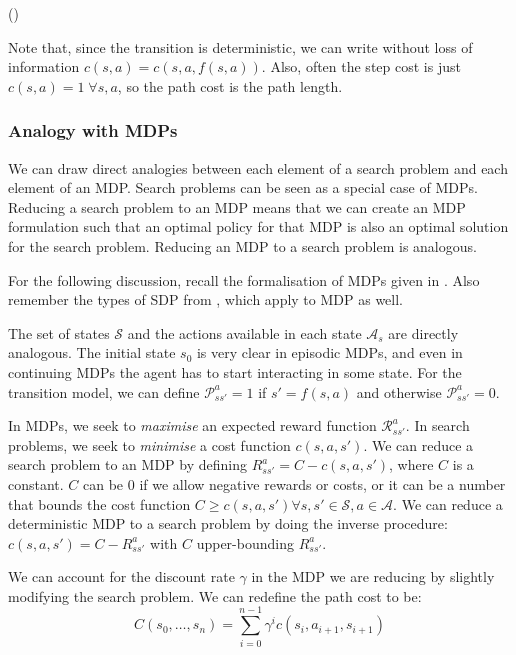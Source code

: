 (\cite[Section~3.1]{russell2009aima})

Note that, since the transition is deterministic, we can write without loss of
information $c(s, a) = c(s, a, f(s, a))$. Also, often the step cost is just
$c(s,a)=1 \; \forall s, a$, so the path cost is the path length. 

\subsubsection{Analogy with \acp{MDP}}
We can draw direct analogies between each element of a search problem and each
element of an \ac{MDP}. Search problems can be seen as a special case of
\acp{MDP}. Reducing a search problem to an \ac{MDP} means that we can create an
\ac{MDP} formulation such that an optimal policy for that \ac{MDP} is also an
optimal solution for the search problem. Reducing an \ac{MDP} to a search
problem is analogous.

For the following discussion, recall the formalisation of \acp{MDP} given in
. Also remember the types of \ac{SDP} from
, which apply to \ac{MDP} as well.

The set of states $\mathcal{S}$ and the actions available in each state
$\mathcal{A}_s$ are directly analogous. The initial state $s_0$ is very clear in
episodic \acp{MDP}, and even in continuing \acp{MDP} the agent has to start
interacting in some state. For the transition model, we can define
$\mathcal{P}^a_{ss'} = 1$ if $s' = f(s, a)$ and otherwise $\mathcal{P}^a_{ss'} =
0$.

In \acp{MDP}, we seek to \emph{maximise} an expected reward function
$\mathcal{R}^a_{ss'}$. In search problems, we seek to \emph{minimise} a cost
function $c(s, a, s')$. We can reduce a search problem to an \ac{MDP} by
defining $R^a_{ss'} = C - c(s, a, s')$, where $C$ is a constant. $C$ can be 0 if
we allow negative rewards or costs, or it can be a number that bounds the cost
function $C \geq c(s, a, s') \forall s,s' \in \mathcal{S}, a \in \mathcal{A}$.
We can reduce a deterministic \ac{MDP} to a search problem by doing the
inverse procedure: $c(s, a, s') = C -R^a_{ss'}$ with $C$ upper-bounding
$R^a_{ss'}$.

We can account for the discount rate $\gamma$ in the \ac{MDP} we are reducing by slightly
modifying the search problem. We can redefine the path cost to be:
\begin{equation}
C(s_0,\dots,s_n) = \sum_{i=0}^{n-1} \gamma^i c(s_i, a_{i+1}, s_{i+1})
\end{equation}

